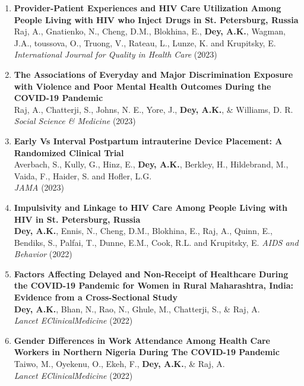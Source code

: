 \documentclass[13pt,letterpaper]{article}
\begin{document}
\begin{enumerate}
\item \textbf{Provider-Patient Experiences and HIV Care Utilization Among People Living with HIV who Inject Drugs in St. Petersburg, Russia}\\
Raj, A., Gnatienko, N., Cheng, D.M., Blokhina, E., \textbf{Dey, A.K.}, Wagman, J.A., toussova, O., Truong, V., Rateau, L., Lunze, K. and Krupitsky, E.\\
\emph{International Journal for Quality in Health Care} (2023) 

\item \textbf{The Associations of Everyday and Major Discrimination Exposure with Violence and Poor Mental Health Outcomes During the COVID-19 Pandemic}\\
Raj, A., Chatterji, S., Johns, N. E., Yore, J., \textbf{Dey, A.K.}, \& Williams, D. R.\\
\emph{Social Science \& Medicine} (2023) 

\item \textbf{Early Vs Interval Postpartum intrauterine Device Placement: A Randomized Clinical Trial}\\
Averbach, S., Kully, G., Hinz, E., \textbf{Dey, A.K.}, Berkley, H., Hildebrand, M., Vaida, F., Haider, S. and Hofler, L.G.\\
\emph{JAMA} (2023) 

\item \textbf{Impulsivity and Linkage to HIV Care Among People Living with HIV in St. Petersburg, Russia}\\
\textbf{Dey, A.K.}, Ennis, N., Cheng, D.M., Blokhina, E., Raj, A., Quinn, E., Bendiks, S., Palfai, T., Dunne, E.M., Cook, R.L. and Krupitsky, E.
\emph{AIDS and Behavior} (2022)  

\item \textbf{Factors Affecting Delayed and Non-Receipt of Healthcare During the COVID-19 Pandemic for Women in Rural Maharashtra, India: Evidence from a Cross-Sectional Study}\\
\textbf{Dey, A.K.}, Bhan, N., Rao, N., Ghule, M., Chatterji, S., \& Raj, A.\\
\emph{Lancet EClinicalMedicine} (2022) 

\item \textbf{Gender Differences in Work Attendance Among Health Care Workers in Northern Nigeria During The COVID-19 Pandemic}\\
Taiwo, M., Oyekenu, O., Ekeh, F., \textbf{Dey, A.K.}, \& Raj, A.\\
\emph{Lancet EClinicalMedicine} (2022) 


\end{enumerate}
\end{document}
